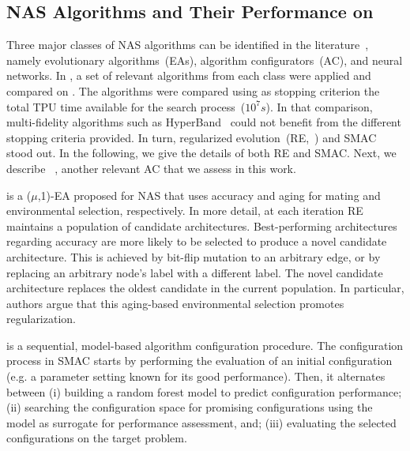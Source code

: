 \subsection{NAS Algorithms and Their Performance on \nasbench}

Three major classes of NAS algorithms can be identified in the literature~\cite{ElsMetHut2019nas-survey}, namely evolutionary algorithms~(EAs), algorithm configurators~(AC), and neural networks. In \cite{YinKleChrReaMurHut2019nasbench}, a set of relevant algorithms from each class were applied and compared on \nasbench. The algorithms were compared using as stopping criterion the total TPU time available for the search process~($10^7s$). In that comparison, multi-fidelity algorithms such as HyperBand~\cite{LiJamSal2018hyperband} could not benefit from the different stopping criteria provided. In turn, regularized evolution~(RE,~\cite{ReaAggHuaLe2019re}) and SMAC~\cite{HutHooLey2011lion} stood out. In the following, we give the details of both RE and SMAC. Next, we describe \irace~\cite{LopDubPerStuBir2016irace}, another relevant AC that we assess in this work.

\begin{description}[style=unboxed, leftmargin=0px]
\item[Regularized evolution] is a ($\mu$,1)-EA proposed for NAS that uses accuracy and aging for mating and environmental selection, respectively. In more detail, at each iteration RE maintains a population of candidate architectures. Best-performing architectures regarding accuracy are more likely to be selected to produce a novel candidate architecture. This is achieved by bit-flip mutation to an arbitrary edge, or by replacing an arbitrary node's label with a different label. The novel candidate architecture replaces the oldest candidate in the current population. In particular, authors argue that this aging-based environmental selection promotes regularization. 

\item[SMAC] is a sequential, model-based algorithm configuration procedure. The configuration process in SMAC starts by performing the evaluation of an initial configuration (e.g. a parameter setting known for its good performance).
Then, it alternates between
(i) building a random forest model to predict configuration
performance; (ii) searching the configuration space for promising configurations using
the model as surrogate for performance assessment,
and; (iii) evaluating the selected configurations on the target problem. 
\end{description}

